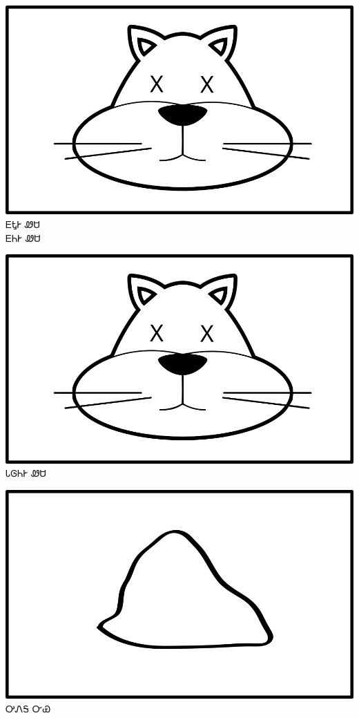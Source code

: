 \documentclass[avery5371]{flashcards}%
\begin{document}
\begin{flashcard}{
\includegraphics[width=0.95\columnwidth,height=.51\columnwidth,keepaspectratio]{../artwork/for-colors/wesa-dead}
}\Huge ᎬᎿᎨ ᏪᏌ\\ᎬᏂᎨ ᏪᏌ
\end{flashcard}

\begin{flashcard}{
\includegraphics[width=0.95\columnwidth,height=.51\columnwidth,keepaspectratio]{../artwork/for-colors/wesa-dead}
}\Huge ᏓᎶᏂᎨ ᏪᏌ
\end{flashcard}


\begin{flashcard}{
\includegraphics[width=0.95\columnwidth,height=.51\columnwidth,keepaspectratio]{../artwork/objects-neutral/nvya}
}\Huge ᎤᏁᎦ ᏅᏯ
\end{flashcard}
\end{document}
